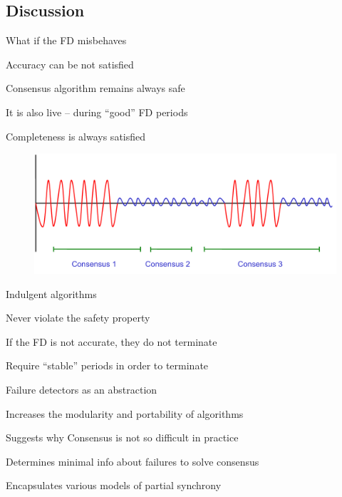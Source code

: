 \subsection{Discussion}

\begin{frame}{What if the FD misbehaves}

\BIL
\item Accuracy can be not satisfied
\BI 
\item Consensus algorithm remains always safe
\item It is also live -- during “good” FD periods
\EI
\item Completeness is always satisfied
\EIL
	
\begin{figure}
	\includegraphics[width=\textwidth]{goodbadtimes}
\end{figure}

\end{frame}

\begin{frame}{Indulgent algorithms}

\begin{definition}
\BI
\item Never violate the safety property
\item If the FD is not accurate, they do not terminate
\item Require “stable” periods in order to terminate
\EI
\end{definition}

\bigskip
{}

\bigskip
\begin{Bib}
\BI
\item {}
\EI
\end{Bib}

\end{frame}


\begin{frame}{Failure detectors as an abstraction}


\BIL
\item Increases the modularity and portability of algorithms
\item Suggests why Consensus is not so difficult in practice
\item Determines minimal info about failures to solve consensus
\item Encapsulates various models of partial synchrony
\EIL

\end{frame}

